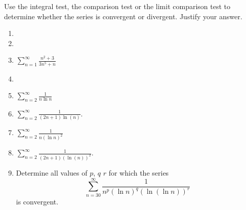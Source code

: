 Use the integral test, the comparison test or the limit comparison test to determine whether the series is convergent or divergent. Justify your answer.
\begin{multicols}{2}
\begin{enumerate}[ref={\fcProblemRef}]
\item 
\item 
\item $\displaystyle \sum\limits_{n=1}^{\infty}\frac{n^2+3}{3n^5+n}$

\item 
\item \label{problemConvergencesum_2^infty1/(xlnx)dx}
$\displaystyle \sum_{n=2}^\infty \frac{1}{n \ln n}$

\item  \label{problemConvergencesum_2^infty1/((2n+1)ln(n)}
$\displaystyle \sum\limits_{n=2}^{\infty} \frac{1}{(2n+1)\ln (n)}$.

\item $\displaystyle \sum\limits_{n=2}^{\infty}\frac{1}{n(\ln n)^2}$

\item 
$\displaystyle \sum\limits_{n=2}^{\infty} \frac{1}{(2n+1)(\ln (n))^2}$.

\item 
Determine all values of $p$, $q$ $r$ for which the series 
\[
\displaystyle \sum_{n=30}^{\infty} \frac{1}{n^p(\ln n)^q(\ln (\ln n))^r}
\]
is convergent.


\end{enumerate}
\end{multicols}

